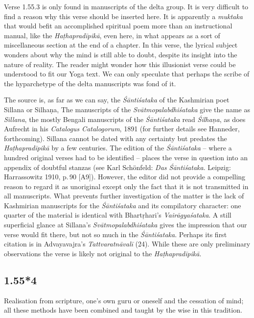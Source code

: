 \begin{ekdosis}
\begin{testimonia}[hp01_055_3]
\end{testimonia}

\begin{philcomm}[hp01_055_3]
Verse 1.55.3 is only found in manuscripts of the delta group. It is very difficult to find a reason why this verse should be inserted here. It is apparently a
\emph{muktaka} that would befit an accomplished spiritual poem more than an instructional manual, like the \emph{Haṭhapradīpikā}, even here, in what appears as a sort of miscellaneous section at the end of a chapter. In this verse, the lyrical subject wonders about why the mind is still able to doubt, despite its insight into the nature of reality. The reader might wonder how this illusionist verse could be understood to fit our Yoga text. We can only speculate that perhaps the scribe of the hyparchetype of the delta manuscripts was fond of it.

The source is, as far as we can say, the \emph{Śāntiśataka} of the Kashmirian poet Sillana or Silhaṇa, The manuscripts of the \emph{Svātmopalabdhiśataka} give the name as \emph{Sillana}, the mostly Bengali manuscripts of the \emph{Śāntiśataka} read \emph{Śilhaṇa}, as does Aufrecht in his \emph{Catalogus Catalogorum}, 1891 (for further details see Hanneder, forthcoming). Sillana cannot be dated with any certainty but predates the \emph{Haṭhapradīpikā} by a few centuries. The
edition of the \emph{Śāntiśataka} – where a hundred original verses had to be identified – places the verse in question into an appendix of doubtful stanzas (see Karl Schönfeld: \emph{Das Śāntiśataka}. Leipzig: Harrassowitz 1910, p.\,90 [A9]). However, the editor did not provide a compelling reason to regard it as
unoriginal except only the fact that it is not transmitted in all manuscripts. What prevents further investigation of the matter is the lack of Kashmirian manuscripts for the \emph{Śāntiśataka} and its compilatory character: one quarter of the material is identical with Bhartṛhari's \emph{Vairāgyaśataka}. A still superficial glance at Sillana's \emph{Svātmopalabdhiśataka} gives the impression that our verse would fit there, but not so much in the \emph{Śāntiśataka}. Perhaps its first citation is in Advayavajra’s \emph{Tattva\-ratnāvalī} (24). While
these are only preliminary observations the verse is likely not original to the \emph{Haṭhapradīpikā}.
\end{philcomm}

\subsection*{1.55*4}
\begin{translation}[hp01_055_4]
Realisation from scripture, one's own guru or oneself and the cessation of mind; all these methods have been combined and taught by the wise in this tradition.
\end{translation}


\end{ekdosis}
